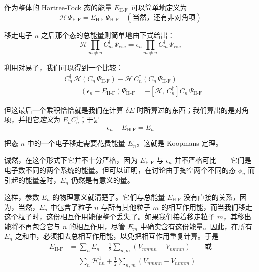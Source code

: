 作为整体的 Hartree-Fock 态的能量 $E_{\text{H-F}}$ 可以简单地定义为
\begin{equation*}
\mathcal{H}\,\Psi_{\text{H-F}} = E_{\text{H-F}}\,\Psi_{\text{H-F}}\quad(\text{当然，还有非对角项})
\end{equation*}

移走电子 $n$ 之后那个态的总能量则简单地由下式给出：
\begin{equation*}
\mathcal{H} \prod_{m\neq n} C_m^{\dagger}\,\Psi_{\mathrm{vac}} = \epsilon_n \prod_{m\neq n} C_m^{\dagger}\,\Psi_{\mathrm{vac}}
\end{equation*}

利用对易子，我们可以得到一个比较：
\begin{align*}
&C_n^{\dagger}\,\mathcal{H}\left(C_n\,\Psi_{\text{H-F}}\right) - \mathcal{H}\,C_n^{\dagger}\left(C_n\,\Psi_{\text{H-F}}\right)\\
&\quad= \left(\epsilon_n - E_{\text{H-F}}\right)\Psi_{\text{H-F}} = -\left[\mathcal{H},\, C_n^{\dagger}\right] C_n\,\Psi_{\text{H-F}}
\end{align*}

但这最后一个乘积恰恰就是我们在计算 $\delta E$ 时所算过的东西；我们算出的是对角项，并把它\emph{定义}为 $E_n C_n^{\dagger}$；于是
\begin{equation*}
\epsilon_n - E_{\text{H-F}} = E_n
\end{equation*}

把态 $n$ 中的一个电子移走需要花费能量 $E_n$。这就是 Koopmans 定理。

诚然，在这个形式下它并不十分严格，因为 $E_{\text{H-F}}$ 与 $\epsilon_n$ 并不严格可比——它们是电子数不同的两个系统的能量。但可以证明，在讨论由于掏空两个不同的态 $\phi_n$ 而引起的能量差时，$E_n$ 仍然是有意义的量。

这样，参数 $E_n$ 的物理意义就清楚了。它们与总能量 $E_{\text{H-F}}$ 没有直接的关系，因为，当然，$E_n$ 中包含了粒子 $n$ 与所有其他粒子 $m$ 的相互作用能，而当我们移走这个粒子时，这份相互作用能便整个丢失了。如果我们接着移走粒子 $m$，其移出能将不再包含它与 $n$ 的相互作用，尽管 $E_m$ 中确实含有这份能量。因此，在所有 $E_n$ 之和中，必须扣去总相互作用能，以免把相互作用重复计算。于是
\begin{align*}
E_{\text{H-F}} &= \sum_n E_n - \frac{1}{2}\sum_{n,m}\left(V_{nmmn} - V_{nmnm}\right)\qquad\text{或}\\
&= \sum_n \mathcal{H}^1_{nn} + \frac{1}{2}\sum_{n,m}\left(V_{nmmn} - V_{nmnm}\right)
\end{align*}
